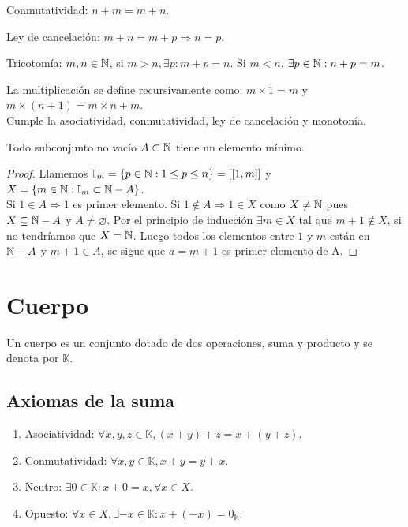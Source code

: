 \begin{prop}
    Conmutatividad: \(n+m = m+n\).
\end{prop}

\begin{prop}
    Ley de cancelación: \(m+n = m+p \Rightarrow n=p\).
\end{prop}

\begin{prop}
    Tricotomía: \(m,n \in \mathbb{N} \), si \(m > n, \exists p:m+p=n\). Si \(m < n\),  \(\exists p \in \mathbb{N} :n+p=m\).
\end{prop}

\begin{definition}
    La multiplicación se define recursivamente como: \(m \times 1 =m\) y \(m \times (n+1) = m \times n + m\). \\
    Cumple la asociatividad, conmutatividad, ley de cancelación y monotonía.
\end{definition}

\begin{theorem}
    Todo subconjunto no vacío \(A \subset \mathbb{N} \) tiene un elemento mínimo.
    \begin{proof}
        Llamemos \(\mathbb{I}_m = \{ p \in \mathbb{N} : 1 \leq p \leq n \} = [[ 1, m ]]\) y \(X = \{ m \in \mathbb{N} : \mathbb{I}_m \subset \mathbb{N} - A \} \). \\
        Si \(1 \in A \Rightarrow 1\) es primer elemento.
        Si \(1 \notin A \Rightarrow 1 \in X\) como \(X \neq \mathbb{N} \) pues \(X \subseteq \mathbb{N} - A\) y \(A \neq \varnothing \).
        Por el principio de inducción \(\exists m \in X\) tal que \(m+1 \notin X\), si no tendríamos que \(X = \mathbb{N} \). Luego todos los elementos entre \(1\) y \(m\) están en \(\mathbb{N} - A\) y \(m+1 \in A\), se sigue que \(a = m+1\) es primer elemento de A.
    \end{proof}
\end{theorem}


\section{Cuerpo}

Un cuerpo es un conjunto dotado de dos operaciones, suma y producto y se denota por \(\mathbb{K} \).

\subsection{Axiomas de la suma}

\begin{enumerate}
    \item Asociatividad: \(\forall x,y,z \in \mathbb{K}, (x+y)+z=x+(y+z) \).
    \item Conmutatividad: \(\forall x,y \in \mathbb{K}, x+y=y+x \).
    \item Neutro: \( \exists 0 \in \mathbb{K} : x+0 = x, \forall x \in X \).
    \item Opuesto: \( \forall x \in X, \exists -x \in \mathbb{K} : x +(-x) = 0_\mathbb{K} \).
\end{enumerate}


